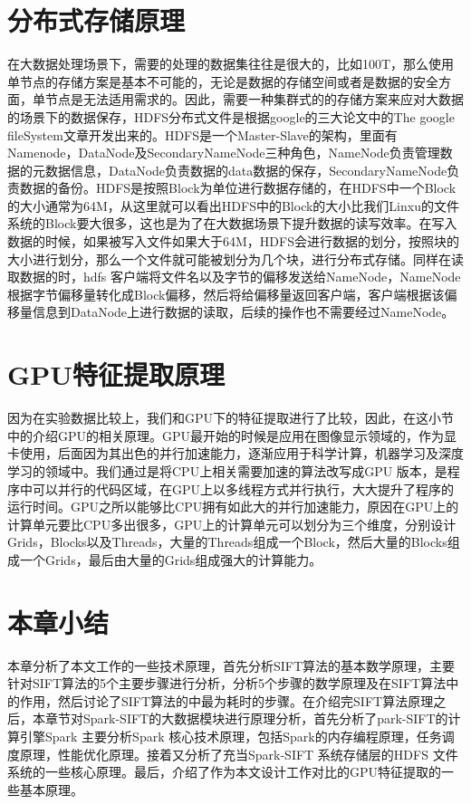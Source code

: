 \section{分布式存储原理}
在大数据处理场景下，需要的处理的数据集往往是很大的，比如100T，那么使用单节点的存储方案是基本不可能的，无论是数据的存储空间或者是数据的安全方面，单节点是无法适用需求的。因此，需要一种集群式的的存储方案来应对大数据的场景下的数据保存，HDFS分布式文件是根据google的三大论文中的The google fileSystem文章开发出来的。HDFS是一个Master-Slave的架构，里面有Namenode，DataNode及SecondaryNameNode三种角色，NameNode负责管理数据的元数据信息，DataNode负责数据的data数据的保存，SecondaryNameNode负责数据的备份。HDFS是按照Block为单位进行数据存储的，在HDFS中一个Block的大小通常为64M，从这里就可以看出HDFS中的Block的大小比我们Linxu的文件系统的Block要大很多，这也是为了在大数据场景下提升数据的读写效率。在写入数据的时候，如果被写入文件如果大于64M，HDFS会进行数据的划分，按照块的大小进行划分，那么一个文件就可能被划分为几个块，进行分布式存储。同样在读取数据的时，hdfs 客户端将文件名以及字节的偏移发送给NameNode，NameNode根据字节偏移量转化成Block偏移，然后将给偏移量返回客户端，客户端根据该偏移量信息到DataNode上进行数据的读取，后续的操作也不需要经过NameNode。
\section{GPU特征提取原理}
因为在实验数据比较上，我们和GPU下的特征提取进行了比较，因此，在这小节中的介绍GPU的相关原理。GPU最开始的时候是应用在图像显示领域的，作为显卡使用，后面因为其出色的并行加速能力，逐渐应用于科学计算，机器学习及深度学习的领域中。我们通过是将CPU上相关需要加速的算法改写成GPU 版本，是程序中可以并行的代码区域，在GPU上以多线程方式并行执行，大大提升了程序的运行时间。GPU之所以能够比CPU拥有如此大的并行加速能力，原因在GPU上的计算单元要比CPU多出很多，GPU上的计算单元可以划分为三个维度，分别设计Grids，Blocks以及Threads，大量的Threads组成一个Block，然后大量的Blocks组成一个Grids，最后由大量的Grids组成强大的计算能力。
\section{本章小结}
本章分析了本文工作的一些技术原理，首先分析SIFT算法的基本数学原理，主要针对SIFT算法的5个主要步骤进行分析，分析5个步骤的数学原理及在SIFT算法中的作用，然后讨论了SIFT算法的中最为耗时的步骤。在介绍完SIFT算法原理之后，本章节对Spark-SIFT的大数据模块进行原理分析，首先分析了park-SIFT的计算引擎Spark 主要分析Spark 核心技术原理，包括Spark的内存编程原理，任务调度原理，性能优化原理。接着又分析了充当Spark-SIFT 系统存储层的HDFS 文件系统的一些核心原理。最后，介绍了作为本文设计工作对比的GPU特征提取的一些基本原理。


